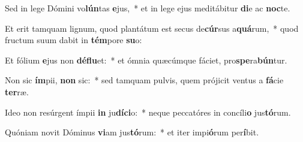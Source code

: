 \item Sed in lege Dómini vo\textbf{lún}tas \textbf{e}jus,~* et in lege ejus meditábitur \textbf{di}e ac \textbf{noc}te.
\item Et erit tamquam lignum, quod plantátum est secus de\textbf{cúr}sus a\textbf{quá}rum,~* quod fructum suum dabit in \textbf{tém}pore \textbf{su}o:
\item Et fólium \textbf{e}jus non \textbf{dé}\textbf{flu}et:~* et ómnia quæcúmque fáciet, pro\textbf{spe}ra\textbf{bún}tur.
\item Non sic \textbf{ím}pii, \textbf{non} sic:~* sed tamquam pulvis, quem prójicit ventus a \textbf{fá}cie \textbf{ter}ræ.
\item Ideo non resúrgent ímpii \textbf{in} ju\textbf{dí}\textbf{ci}o:~* neque peccatóres in concíli\textbf{o} jus\textbf{tó}rum.
\item Quóniam novit Dóminus \textbf{vi}am jus\textbf{tó}rum:~* et iter impi\textbf{ó}rum per\textbf{í}bit.

